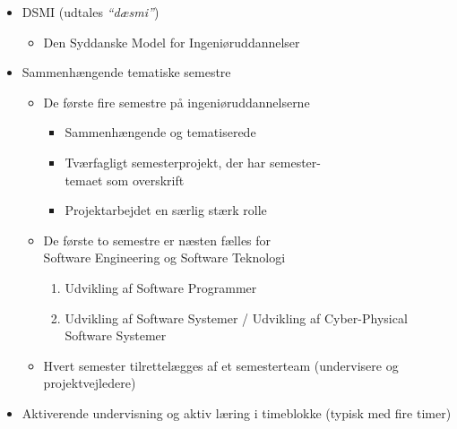 \documentclass[t, aspectratio=169]{beamer}
\newcommand{\quoted}[1]{\textsl{``#1''}}
\begin{document}
\begin{frame}[fragile]
  \vspace{0mm}
  \begin{itemize}
    \pause
    \item DSMI (udtales \quoted{dæsmi})
      \begin{itemize}
        \item Den Syddanske Model for Ingeniøruddannelser
      \end{itemize}
    \pause
    \item Sammenhængende tematiske semestre
      \begin{itemize}
        \item De første fire semestre på ingeniøruddannelserne
          \begin{itemize}
            \item Sammenhængende og tematiserede
            \item Tværfagligt semesterprojekt, der har semester-\\temaet som overskrift
            \item Projektarbejdet en særlig stærk rolle
          \end{itemize}
        \item De første to semestre er næsten fælles for\\Software Engineering og Software Teknologi
          \begin{enumerate}
            \item Udvikling af Software Programmer
            \item Udvikling af Software Systemer / Udvikling af Cyber-Physical Software Systemer
          \end{enumerate}
        \item Hvert semester tilrettelægges af et semesterteam (undervisere og projektvejledere)
      \end{itemize}
    \pause
    \item Aktiverende undervisning og aktiv læring i timeblokke (typisk med fire timer)
  \end{itemize}
\end{frame}
\end{document}
